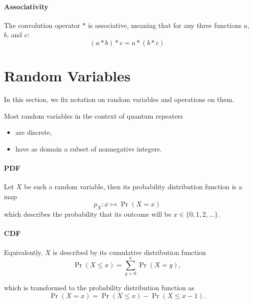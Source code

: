 \documentclass{masterthesis}
\begin{document}
\paragraph*{Associativity}
\begin{samepage}
    The convolution operator \( * \) is associative, meaning that for any three functions \(a\), \(b\), and \(c\):
    \begin{equation}\label{eq:convolution_associativity} 
        (a * b) * c = a * (b * c)
    \end{equation}        
\end{samepage}

\section*{Random Variables}

In this section, we fix notation on random variables and operations on them. 

Most random variables in the context of quantum repeaters
\begin{itemize}
    \item are discrete,
    \item have as domain a subset of nonnegative integers.
\end{itemize}

\paragraph*{PDF}\label{paragraph:pdf}
Let $X$ be such a random variable, then its probability distribution function is a map
\begin{equation}
    p_X : x \mapsto \Pr(X = x)
\end{equation} 
which describes the probability that its outcome will be $x \in \{0, 1, 2, \ldots \}$.

\paragraph*{CDF}\label{paragraph:cdf}
Equivalently, $X$ is described by its cumulative distribution function
\begin{equation}
    \Pr(X \leq x) = \sum_{y=0}^{x} \Pr(X = y),
\end{equation}

which is transformed to the probability distribution function as 
\begin{equation}
    \Pr(X = x) = \Pr(X \leq x) - \Pr(X \leq x - 1).
\end{equation}
\end{document}
